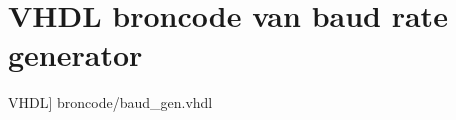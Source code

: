 \section[Baud rate generator]{VHDL broncode van baud rate generator}\label{appdix:baudgen} 
	\scriptsize
	 VHDL] {broncode/baud_gen.vhdl}
	\normalsize

